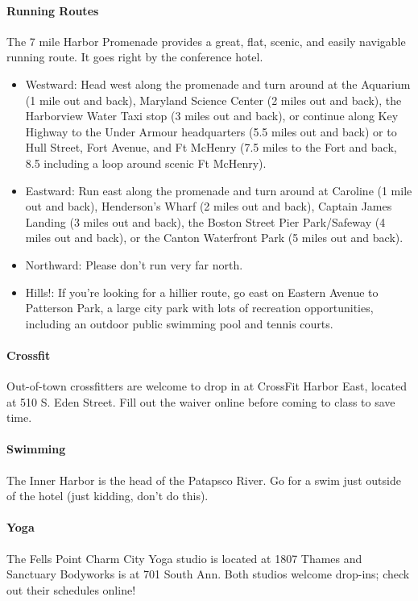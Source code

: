 \paragraph*{Running Routes}
The 7 mile Harbor Promenade provides a great, flat, scenic, and easily navigable running route. It goes right by the conference hotel. 

\begin{itemize}
\item{Westward: Head west along the promenade and turn around at the Aquarium (1 mile out and back), Maryland Science Center (2 miles out and back), the Harborview Water Taxi stop (3 miles out and back), or continue along Key Highway to the Under Armour headquarters (5.5 miles out and back) or to Hull Street, Fort Avenue, and Ft McHenry (7.5 miles to the Fort and back, 8.5 including a loop around scenic Ft McHenry).}
\item{Eastward: Run east along the promenade and turn around at Caroline (1 mile out and back), Henderson's Wharf (2 miles out and back), Captain James Landing (3 miles out and back), the Boston Street Pier Park/Safeway (4 miles out and back), or the Canton Waterfront Park (5 miles out and back).}
\item{Northward: Please don't run very far north.}
\item{Hills!: If you're looking for a hillier route, go east on Eastern Avenue to Patterson Park, a large city park with lots of recreation opportunities, including an outdoor public swimming pool and tennis courts.}
\end{itemize}

\paragraph*{Crossfit}
Out-of-town crossfitters are welcome to drop in at CrossFit Harbor East, located at 510 S. Eden Street. Fill out the waiver online before coming to class to save time.

\paragraph*{Swimming}
The Inner Harbor is the head of the Patapsco River. Go for a swim just outside of the hotel (just kidding, don't do this). 

\paragraph*{Yoga}
The Fells Point Charm City Yoga studio is located at 1807 Thames and Sanctuary Bodyworks is at 701 South Ann. Both studios welcome drop-ins; check out their schedules online! 

